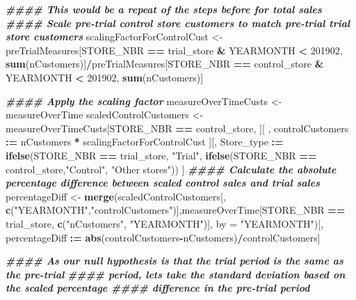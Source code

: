 \documentclass[
]{article}
\newenvironment{Shaded}{\begin{snugshade}}{\end{snugshade}}
\newcommand{\AttributeTok}[1]{\textcolor[rgb]{0.13,0.29,0.53}{#1}}
\newcommand{\DecValTok}[1]{\textcolor[rgb]{0.00,0.00,0.81}{#1}}
\newcommand{\DocumentationTok}[1]{\textcolor[rgb]{0.56,0.35,0.01}{\textbf{\textit{#1}}}}
\newcommand{\FunctionTok}[1]{\textcolor[rgb]{0.13,0.29,0.53}{\textbf{#1}}}
\newcommand{\NormalTok}[1]{#1}
\newcommand{\OtherTok}[1]{\textcolor[rgb]{0.56,0.35,0.01}{#1}}
\newcommand{\SpecialCharTok}[1]{\textcolor[rgb]{0.81,0.36,0.00}{\textbf{#1}}}
\newcommand{\StringTok}[1]{\textcolor[rgb]{0.31,0.60,0.02}{#1}}
\begin{document}
\begin{Shaded}
\begin{Highlighting}[]
\DocumentationTok{\#\#\#\# This would be a repeat of the steps before for total sales}
\DocumentationTok{\#\#\#\# Scale pre{-}trial control store customers to match pre{-}trial trial store customers}
\NormalTok{scalingFactorForControlCust }\OtherTok{\textless{}{-}}\NormalTok{ preTrialMeasures[STORE\_NBR }\SpecialCharTok{==}\NormalTok{ trial\_store }\SpecialCharTok{\&}
\NormalTok{YEARMONTH }\SpecialCharTok{\textless{}} \DecValTok{201902}\NormalTok{, }\FunctionTok{sum}\NormalTok{(nCustomers)]}\SpecialCharTok{/}\NormalTok{preTrialMeasures[STORE\_NBR }\SpecialCharTok{==}
\NormalTok{control\_store }\SpecialCharTok{\&}\NormalTok{ YEARMONTH }\SpecialCharTok{\textless{}} \DecValTok{201902}\NormalTok{, }\FunctionTok{sum}\NormalTok{(nCustomers)]}

\DocumentationTok{\#\#\#\# Apply the scaling factor}
\NormalTok{measureOverTimeCusts }\OtherTok{\textless{}{-}}\NormalTok{ measureOverTime}
\NormalTok{scaledControlCustomers }\OtherTok{\textless{}{-}}\NormalTok{ measureOverTimeCusts[STORE\_NBR }\SpecialCharTok{==}\NormalTok{ control\_store,}
\NormalTok{][ , controlCustomers }\SpecialCharTok{:=}\NormalTok{ nCustomers }\SpecialCharTok{*}\NormalTok{ scalingFactorForControlCust}
\NormalTok{][, Store\_type }\SpecialCharTok{:=} \FunctionTok{ifelse}\NormalTok{(STORE\_NBR }\SpecialCharTok{==}\NormalTok{ trial\_store, }\StringTok{"Trial"}\NormalTok{,}
\FunctionTok{ifelse}\NormalTok{(STORE\_NBR }\SpecialCharTok{==}\NormalTok{ control\_store,}\StringTok{"Control"}\NormalTok{, }\StringTok{"Other stores"}\NormalTok{))}
\NormalTok{]}
\DocumentationTok{\#\#\#\# Calculate the absolute percentage difference between scaled control sales and trial sales}
\NormalTok{percentageDiff }\OtherTok{\textless{}{-}} \FunctionTok{merge}\NormalTok{(scaledControlCustomers[, }\FunctionTok{c}\NormalTok{(}\StringTok{"YEARMONTH"}\NormalTok{,}\StringTok{"controlCustomers"}\NormalTok{)],measureOverTime[STORE\_NBR }\SpecialCharTok{==}\NormalTok{ trial\_store, }\FunctionTok{c}\NormalTok{(}\StringTok{"nCustomers"}\NormalTok{, }\StringTok{"YEARMONTH"}\NormalTok{)],}
\AttributeTok{by =} \StringTok{"YEARMONTH"}\NormalTok{)[, percentageDiff }\SpecialCharTok{:=} \FunctionTok{abs}\NormalTok{(controlCustomers}\SpecialCharTok{{-}}\NormalTok{nCustomers)}\SpecialCharTok{/}\NormalTok{controlCustomers]}

\DocumentationTok{\#\#\#\# As our null hypothesis is that the trial period is the same as the pre{-}trial}
\DocumentationTok{\#\#\#\# period, let\textquotesingle{}s take the standard deviation based on the scaled percentage \#\#\#\# difference in the pre{-}trial period}


\end{Highlighting}
\end{Shaded}
\end{document}
